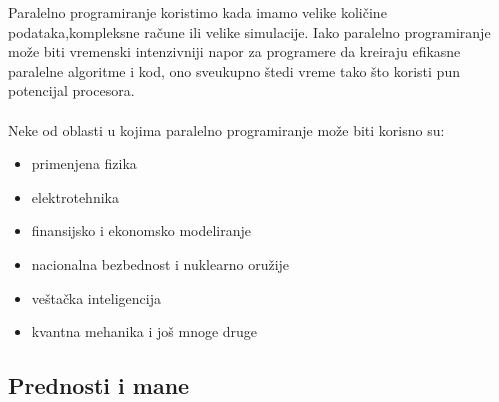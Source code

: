 \documentclass[a4paper]{article}
\begin{document}
{Paralelno programiranje koristimo kada imamo velike količine podataka,kompleksne račune ili velike simulacije. Iako paralelno programiranje može biti vremenski intenzivniji napor za programere da kreiraju efikasne paralelne algoritme i kod, ono sveukupno štedi vreme tako što koristi pun potencijal procesora.\\\\Neke od oblasti u kojima paralelno programiranje može biti korisno su:
\begin{itemize}
\item primenjena fizika\cite{totalview}
\item elektrotehnika\cite{totalview}
\item finansijsko i ekonomsko modeliranje\cite{totalview}
\item nacionalna bezbednost i nuklearno oružije\cite{totalview}
\item veštačka inteligencija\cite{perforce}
\item kvantna mehanika\cite{totalview} i još mnoge druge
\end{itemize}

\subsection{Prednosti i mane}

}
\end{document}
